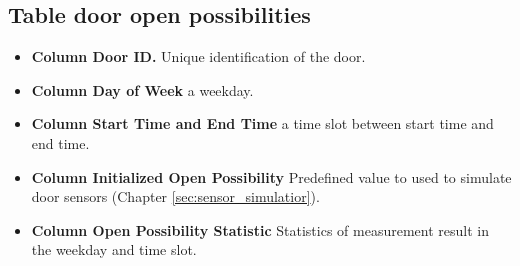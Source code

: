 \subsection*{Table door open possibilities}
\begin{itemize}
    \item \textbf{Column Door ID.} Unique identification of the door. 
    \item \textbf{Column Day of Week} a weekday.
    \item \textbf{Column Start Time and End Time} a time slot between start time and end time.
    \item \textbf{Column Initialized Open Possibility} Predefined value to used to simulate door sensors (Chapter \ref{sec:sensor_simulatior}).
    \item \textbf{Column Open Possibility Statistic} Statistics of measurement result in the weekday and time slot.
    \begin{table}[htb]
    \centering
    \caption{Door Open Possibility.}
    \label{tab:db_open_possibilities}
    \end{table}
\end{itemize}

